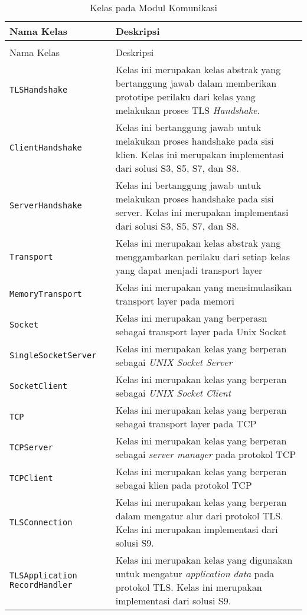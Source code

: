 \begin{longtable}{|p{4cm}|p{8cm}|}
  \caption{Kelas pada Modul Komunikasi} \label{tab:impl.comm} \\
  \hline
  Nama Kelas & Deskripsi \\ \hline
  \endfirsthead
  \caption[]{Kelas pada Modul Komunikasi} \\

  \hline
    Nama Kelas & Deskripsi \\ \hline
    \endhead

    \texttt{TLSHandshake} & Kelas ini merupakan kelas abstrak yang bertanggung jawab dalam memberikan prototipe perilaku dari kelas yang melakukan proses TLS \emph{Handshake}.\\ \hline
    \texttt{ClientHandshake} & Kelas ini bertanggung jawab untuk melakukan proses handshake pada sisi klien. Kelas ini merupakan implementasi dari solusi S3, S5, S7, dan S8.\\ \hline
    \texttt{ServerHandshake} & Kelas ini bertanggung jawab untuk melakukan proses handshake pada sisi server. Kelas ini merupakan implementasi dari solusi S3, S5, S7, dan S8.\\ \hline
    \texttt{Transport} & Kelas ini merupakan kelas abstrak yang menggambarkan perilaku dari setiap kelas yang dapat menjadi transport layer\\ \hline
    \texttt{MemoryTransport} & Kelas ini merupakan yang mensimulasikan transport layer pada memori\\ \hline
    \texttt{Socket} & Kelas ini merupakan yang berperasn sebagai transport layer pada Unix Socket\\ \hline
    \texttt{SingleSocketServer} & Kelas ini merupakan kelas yang berperan sebagai \emph{UNIX Socket Server}\\ \hline
    \texttt{SocketClient} & Kelas ini merupakan kelas yang berperan sebagai \emph{UNIX Socket Client}\\ \hline
    \texttt{TCP} & Kelas ini merupakan kelas yang berperan sebagai transport layer pada TCP\\ \hline
    \texttt{TCPServer} & Kelas ini merupakan kelas yang berperan sebagai \emph{server manager} pada protokol TCP\\ \hline
    \texttt{TCPClient} & Kelas ini merupakan kelas yang berperan sebagai klien pada protokol TCP\\ \hline
    \texttt{TLSConnection} & Kelas ini merupakan kelas yang berperan dalam mengatur alur dari protokol TLS. Kelas ini merupakan implementasi dari solusi S9.\\ \hline
    \texttt{TLSApplication} \texttt{RecordHandler} & Kelas ini merupakan kelas yang digunakan untuk mengatur \emph{application data} pada protokol TLS. Kelas ini merupakan implementasi dari solusi S9.\\ \hline
\end{longtable}
  
